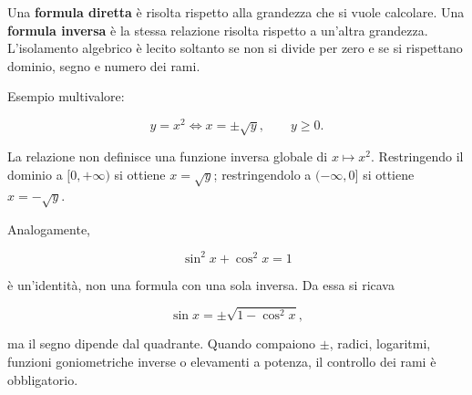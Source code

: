 Una \textbf{formula diretta} è risolta rispetto alla grandezza che si vuole calcolare. Una \textbf{formula inversa} è la stessa relazione risolta rispetto a un'altra grandezza. L'isolamento algebrico è lecito soltanto se non si divide per zero e se si rispettano dominio, segno e numero dei rami.

Esempio multivalore:

\[
y=x^2
\Longleftrightarrow
x=\pm\sqrt y,
\qquad y\ge0.
\]

La relazione non definisce una funzione inversa globale di \(x\mapsto x^2\). Restringendo il dominio a \([0,+\infty)\) si ottiene \(x=\sqrt y\); restringendolo a \((-\infty,0]\) si ottiene \(x=-\sqrt y\).

Analogamente,

\[
\sin^2x+\cos^2x=1
\]

è un'identità, non una formula con una sola inversa. Da essa si ricava

\[
\sin x=\pm\sqrt{1-\cos^2x},
\]

ma il segno dipende dal quadrante. Quando compaiono \(\pm\), radici, logaritmi, funzioni goniometriche inverse o elevamenti a potenza, il controllo dei rami è obbligatorio.
